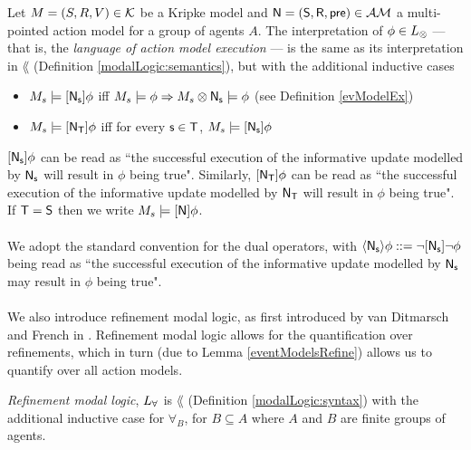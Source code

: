 \begin{defn} \label{actModelLogic:semantics}
Let $M = (S, R, V) \in \mathcal{K}$ be a Kripke model and $\mathrm{\mathsf{\mathrm{\mathsf{N}}
  = (S, R, pre)}} \in
\mathcal{AM}$ a multi-pointed action model for a group of agents $A$.
The interpretation of $\phi \in L_{\otimes}$ --- that is, the {\em language of action model execution} ---  is the same as its interpretation in $\lang$
(Definition \ref{modalLogic:semantics}), but with the additional
inductive cases
\begin{itemize}
	\item $M_s \models [{\mathrm{\mathsf{\mathrm{\mathsf{N}}_s}}}] \phi$ iff $M_s \models
  \phi \Rightarrow M_s \otimes \mathrm{\mathsf{\mathrm{\mathsf{N}}_s}} \models
	\phi$ (see Definition \ref{evModelEx})
	\item $M_s \models [{\mathrm{\mathsf{\mathrm{\mathsf{N}}_T}}}] \phi$ iff for every $\mathrm{\mathsf{s
    \in T}}$, $M_s \models [{\mathrm{\mathsf{\mathrm{\mathsf{N}}_s}}}] \phi$ 
\end{itemize}
\end{defn}

$[{\mathrm{\mathsf{\mathrm{\mathsf{N}}_s}}}] \phi$ can be read as ``the successful execution of the informative update modelled by
$\mathrm{\mathsf{\mathrm{\mathsf{N}}_s}}$ will result in $\phi$ being true".
Similarly, $[{\mathrm{\mathsf{\mathrm{\mathsf{N}}_T}}}] \phi$ can be read as ``the successful execution of the informative update
modelled by $\mathrm{\mathsf{\mathrm{\mathsf{N}}_T}}$ will result in $\phi$ being true".
If $\mathrm{\mathsf{T = S}}$ then we write $M_s \models [{\mathrm{\mathsf{\mathrm{\mathsf{N}}}}}] \phi$.\\
\\
We adopt the standard convention for the dual operators, with $\langle {
 \ensuremath {\mathrm{\mathsf{\mathrm{\mathsf{N}}_s}}}  } \rangle \phi ::= \neg [{\mathrm{\mathsf{N}}_\mathrm{\mathsf{s}}}] \neg \phi$ being
read as ``the successful execution of the informative update modelled by
$\mathrm{\mathsf{\mathrm{\mathsf{N}}_s}}$ may result in $\phi$ being true".\\
\\
We also introduce refinement modal logic, as first introduced by van Ditmarsch and French in
\cite{van2009simulation}.
Refinement modal logic allows for the quantification over refinements, which in turn (due to Lemma
\ref{eventModelsRefine}) allows us to quantify over all action models.

\begin{defn} \label{refineLogic:syntax}
{\em Refinement modal logic}, $L_{\forall}$ is $\lang$ (Definition
\ref{modalLogic:syntax}) with the additional inductive case for $\forall_B$, for $B \subseteq A$
where $A$ and $B$ are finite groups of agents.
\end{defn}

